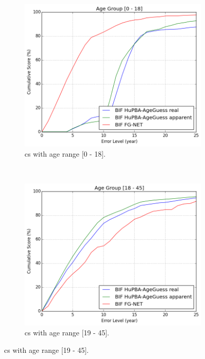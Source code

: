 \begin{figure}[!h]
	\centering
	\begin{subfigure}[b]{0.5\textwidth}
		\includegraphics[width=\textwidth]{figures/results_hybrid_cum_score_good_ag0}
		\caption{\acrshort{cs} with age range [0 - 18].}
		\label{fig:cumS_BIF_ag0}
	\end{subfigure}%
	~
	\begin{subfigure}[b]{0.5\textwidth}
		\includegraphics[width=\textwidth]{figures/results_hybrid_cum_score_good_ag1}
		\caption{\acrshort{cs} with age range [19 - 45].}
		\label{fig:cumS_BIF_ag1}
	\end{subfigure} %
	

\end{figure}
